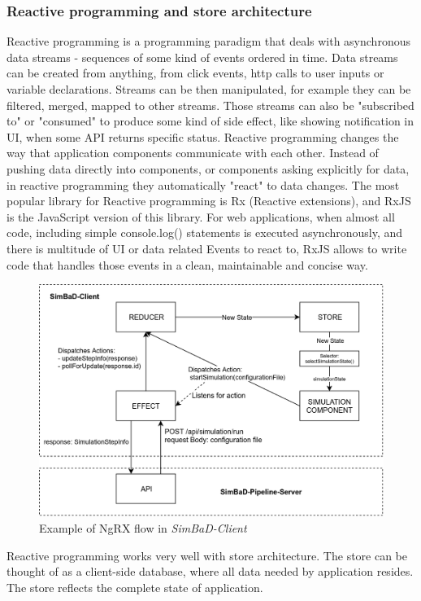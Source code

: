 \subsubsection{Reactive programming and store architecture}
Reactive programming is a programming paradigm that deals with asynchronous data streams - sequences of some kind of events ordered in time. Data streams can be created from anything, from click events, http calls to user inputs or variable declarations. Streams can be then manipulated, for example they can be filtered, merged, mapped to other streams. Those streams can also be "subscribed to" or "consumed" to produce some kind of side effect, like showing notification in UI, when some API returns specific status. Reactive programming changes the way that application components communicate with each other. Instead of pushing data directly into components, or components asking explicitly for data, in reactive programming they automatically "react" to data changes. The most popular library for Reactive programming is Rx (Reactive extensions), and RxJS is the JavaScript version of this library. For web applications, when almost all code, including simple console.log() statements is executed asynchronously, and there is multitude of UI or data related Events to react to, RxJS allows to write code that handles those events in a clean, maintainable and concise way.
\begin{figure}[h!]
	\centering
		\includegraphics[width=0.9\linewidth]{diagrams/ngrx.png}
	\caption{Example of NgRX flow in \textit{SimBaD-Client}}
	\label{fig:ngrx}
\end{figure}
Reactive programming works very well with store architecture. The store can be thought of as a client-side database, where all data needed by application resides. The store reflects the complete state of application.
